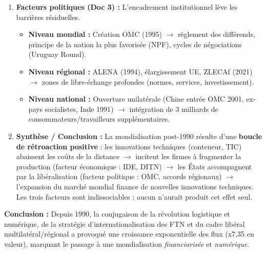 \documentclass[11pt]{article}
\newcommand{\cle}[1]{{\popxbold\color{popdark}#1}}
\begin{document}
\begin{exoresolu}
\begin{enumerate}
            \begin{itemize}
                \item Le graphique (Doc 2) montre une multiplication par \num{7,35} du volume des exportations entre 1990 (3\,400 Md\$) et 2022 (25\,000 Md\$).
                \item Taux de croissance moyen annuel (TCAM) : $\left(\frac{25000}{3400}\right)^{\frac{1}{32}}-1 \approx 6,4\%$ par an, bien supérieur à la croissance du PIB mondial ($\sim 3\%$). C'est la \cle{mondialisation en profondeur} (échanges croissent plus vite que la production).
                \item Moteur : Investissements directs à l'étranger (IDE) des FTN, fragmentation de la chaîne de valeur (DITN - Division Internationale du Travail Nouvelle).
            \end{itemize}
        \item \textbf{Facteurs politiques (Doc 3) :} L'encadrement institutionnel lève les barrières résiduelles.
            \begin{itemize}
                \item \textbf{Niveau mondial :} Création OMC (1995) $\rightarrow$ règlement des différends, principe de la nation la plus favorisée (NPF), cycles de négociations (Uruguay Round).
                \item \textbf{Niveau régional :} ALENA (1994), élargissement UE, ZLECAf (2021) $\rightarrow$ zones de libre-échange profondes (normes, services, investissement).
                \item \textbf{Niveau national :} Ouverture unilatérale (Chine entrée OMC 2001, ex-pays socialistes, Inde 1991) $\rightarrow$ intégration de 3 milliards de consommateurs/travailleurs supplémentaires.
            \end{itemize}
        \item \textbf{Synthèse / Conclusion :} La mondialisation post-1990 résulte d'une \textbf{boucle de rétroaction positive} : les innovations techniques (conteneur, TIC) abaissent les coûts de la distance $\rightarrow$ incitent les firmes à fragmenter la production (facteur économique : IDE, DITN) $\rightarrow$ les États accompagnent par la libéralisation (facteur politique : OMC, accords régionaux) $\rightarrow$ l'expansion du marché mondial finance de nouvelles innovations techniques. Les trois facteurs sont indissociables ; aucun n'aurait produit cet effet seul.
    \end{enumerate}
    \textbf{Conclusion :} Depuis 1990, la conjugaison de la révolution logistique et numérique, de la stratégie d'internationalisation des FTN et du cadre libéral multilatéral/régional a provoqué une croissance exponentielle des flux (x7,35 en valeur), marquant le passage à une mondialisation \emph{financiarisée} et \emph{numérique}.
\end{exoresolu}
\end{document}

